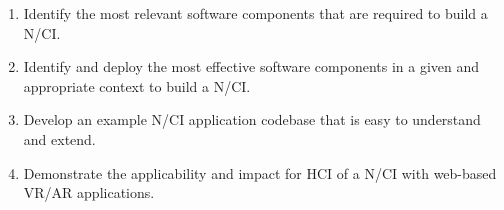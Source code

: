 \begin{enumerate}
  \item Identify the most relevant software components that are required to build a N/CI.
  \item Identify and deploy the most effective software components in a given and appropriate context to build a N/CI.
  \item Develop an example N/CI application codebase that is easy to understand and extend.
  \item Demonstrate the applicability and impact for HCI of a N/CI with web-based VR/AR applications.
\end{enumerate}

